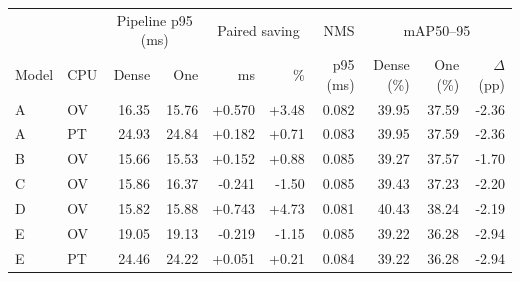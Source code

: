 \begin{tabular}{llrrrrrrrr}
\hline
 & & \multicolumn{2}{c}{Pipeline p95 (ms)} & \multicolumn{2}{c}{Paired saving} & NMS & \multicolumn{3}{c}{mAP50--95} \\
Model & CPU & Dense & One & ms & \% & p95 (ms) & Dense (\%) & One (\%) & $\Delta$ (pp) \\
\hline
A & OV & 16.35 & 15.76 & +0.570 & +3.48 & 0.082 & 39.95 & 37.59 & -2.36 \\
A & PT & 24.93 & 24.84 & +0.182 & +0.71 & 0.083 & 39.95 & 37.59 & -2.36 \\
B & OV & 15.66 & 15.53 & +0.152 & +0.88 & 0.085 & 39.27 & 37.57 & -1.70 \\
C & OV & 15.86 & 16.37 & -0.241 & -1.50 & 0.085 & 39.43 & 37.23 & -2.20 \\
D & OV & 15.82 & 15.88 & +0.743 & +4.73 & 0.081 & 40.43 & 38.24 & -2.19 \\
E & OV & 19.05 & 19.13 & -0.219 & -1.15 & 0.085 & 39.22 & 36.28 & -2.94 \\
E & PT & 24.46 & 24.22 & +0.051 & +0.21 & 0.084 & 39.22 & 36.28 & -2.94 \\
\hline
\end{tabular}
